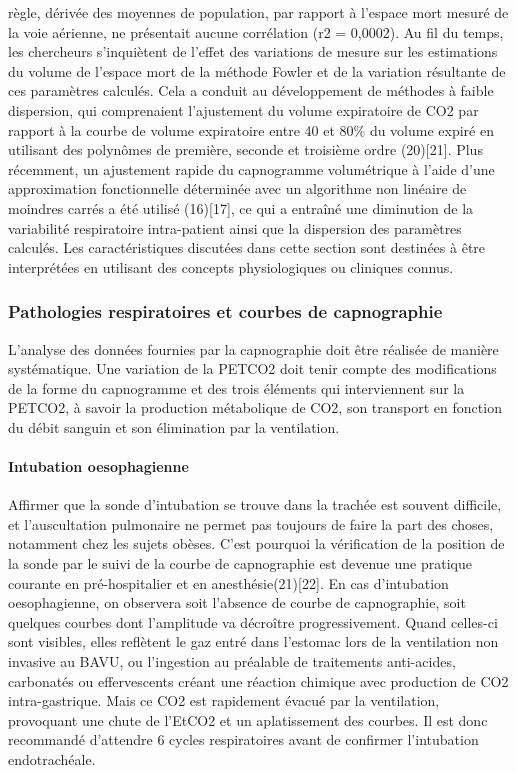 \documentclass[12pt,]{article}
\let\oldparagraph\paragraph
\renewcommand{\paragraph}[1]{\oldparagraph{#1}\mbox{}}
\begin{document}
règle, dérivée des moyennes de population, par rapport à l'espace mort
mesuré de la voie aérienne, ne présentait aucune corrélation (r2 =
0,0002). Au fil du temps, les chercheurs s'inquiètent de l'effet des
variations de mesure sur les estimations du volume de l'espace mort de
la méthode Fowler et de la variation résultante de ces paramètres
calculés. Cela a conduit au développement de méthodes à faible
dispersion, qui comprenaient l'ajustement du volume expiratoire de CO2
par rapport à la courbe de volume expiratoire entre 40 et 80\% du volume
expiré en utilisant des polynômes de première, seconde et troisième
ordre (20){[}21{]}. Plus récemment, un ajustement rapide du capnogramme
volumétrique à l'aide d'une approximation fonctionnelle déterminée avec
un algorithme non linéaire de moindres carrés a été utilisé
(16){[}17{]}, ce qui a entraîné une diminution de la variabilité
respiratoire intra-patient ainsi que la dispersion des paramètres
calculés. Les caractéristiques discutées dans cette section sont
destinées à être interprétées en utilisant des concepts physiologiques
ou cliniques connus.

\subsubsection{Pathologies respiratoires et courbes de
capnographie}\label{pathologies-respiratoires-et-courbes-de-capnographie}

L'analyse des données fournies par la capnographie doit être réalisée de
manière systématique. Une variation de la PETCO2 doit tenir compte des
modifications de la forme du capnogramme et des trois éléments qui
interviennent sur la PETCO2, à savoir la production métabolique de CO2,
son transport en fonction du débit sanguin et son élimination par la
ventilation.

\paragraph{Intubation oesophagienne}\label{intubation-oesophagienne}

Affirmer que la sonde d'intubation se trouve dans la trachée est souvent
difficile, et l'auscultation pulmonaire ne permet pas toujours de faire
la part des choses, notamment chez les sujets obèses. C'est pourquoi la
vérification de la position de la sonde par le suivi de la courbe de
capnographie est devenue une pratique courante en pré-hospitalier et en
anesthésie(21){[}22{]}. En cas d'intubation oesophagienne, on observera
soit l'absence de courbe de capnographie, soit quelques courbes dont
l'amplitude va décroître progressivement. Quand celles-ci sont visibles,
elles reflètent le gaz entré dans l'estomac lors de la ventilation non
invasive au BAVU, ou l'ingestion au préalable de traitements
anti-acides, carbonatés ou effervescents créant une réaction chimique
avec production de CO2 intra-gastrique. Mais ce CO2 est rapidement
évacué par la ventilation, provoquant une chute de l'EtCO2 et un
aplatissement des courbes. Il est donc recommandé d'attendre 6 cycles
respiratoires avant de confirmer l'intubation endotrachéale.
\end{document}
